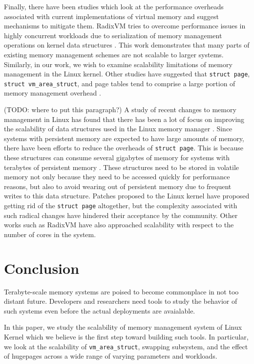 \documentclass[twocolumn,11pt]{article}
\begin{document}
Finally, there have been studies which look at the performance overheads
associated with current implementations of virtual memory and suggest mechanisms
to mitigate them. RadixVM tries to overcome performance issues in highly
concurrent workloads due to serialization of memory management operations on
kernel data structures \cite{radixvm}. This work demonstrates that many parts of
existing memory management schemes are not scalable to larger systems.
Similarly, in our work, we wish to examine scalability limitations of memory
management in the Linux kernel. Other studies have suggested that \texttt{struct
page}, \texttt{struct vm\_area\_struct}, and page tables tend to comprise a
large portion of memory management overhead \cite{simics, struct_page}. 


(TODO: where to put this paragraph?)
A study of recent changes to memory management in Linux has found that there
has been a lot of focus on improving the scalability of data structures used in
the Linux memory manager \cite{huang2016evolutionary}. Since systems with
persistent memory are expected to have large amounts of memory, there have been
efforts to reduce the overheads of \texttt{struct page}. This is because these
structures can consume several gigabytes of memory for systems with terabytes
of persistent memory \cite{corbet_persistent_progress}. These structures need
to be stored in volatile memory not only because they need to be accessed
quickly for performance reasons, but also to avoid wearing out of persistent
memory due to frequent writes to this data structure. Patches proposed to the
Linux kernel have proposed getting rid of the \texttt{struct page} altogether, but the
complexity associated with such radical changes have hindered their acceptance
by the community. Other works such as RadixVM \cite{radixvm} have also
approached scalability with respect to the number of cores in the system.


\section{Conclusion}
Terabyte-scale memory systems are poised to become commonplace in not too distant future.
Developers and researchers need tools to study the behavior of such systems even before the actual
deployments are avaialable. 

In this paper, we study the scalability of memory management 
system of Linux Kernel which we believe is the first step toward building such tools. In particular, 
we look at the scalability of \texttt{vm\_area\_struct},  
swapping subsystem, and the effect of hugepages across a wide range of varying parameters
and workloads. 
\end{document}
